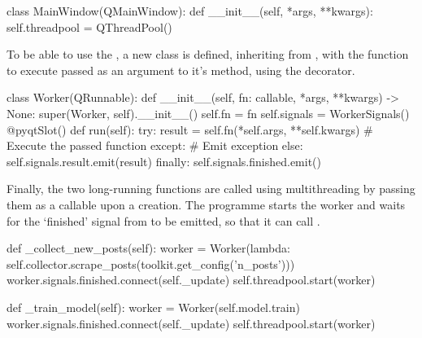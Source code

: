     \begin{python}
class MainWindow(QMainWindow):
    def __init__(self, *args, **kwargs):
        self.threadpool = QThreadPool()
    \end{python}

    To be able to use the , a new class  is defined, inheriting from , with the function to execute passed as an argument to it's  method, using the  decorator.

    \begin{python}
class Worker(QRunnable):
    def __init__(self, fn: callable, *args, **kwargs) -> None:
        super(Worker, self).__init__()
        self.fn = fn
        self.signals = WorkerSignals()
    @pyqtSlot()
    def run(self):
        try:
            result = self.fn(*self.args, **self.kwargs) # Execute the passed function
        except: # Emit exception
        else:
            self.signals.result.emit(result)
        finally:
            self.signals.finished.emit()
    \end{python}

    Finally, the two long-running functions are called using multithreading by passing them as a callable upon a  creation. The programme starts the worker and waits for the `finished' signal from to be emitted, so that it can call .

    \begin{python}
def _collect_new_posts(self):
    worker = Worker(lambda: self.collector.scrape_posts(toolkit.get_config('n_posts')))
    worker.signals.finished.connect(self._update)
    self.threadpool.start(worker)

def _train_model(self):
    worker = Worker(self.model.train)
    worker.signals.finished.connect(self._update)
    self.threadpool.start(worker)
    \end{python}